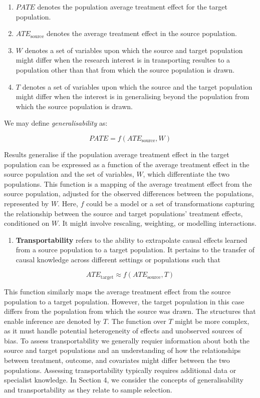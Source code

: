 \documentclass[
  singlecolumn]{report}
\providecommand{\tightlist}{%
  \setlength{\itemsep}{0pt}\setlength{\parskip}{0pt}}\usepackage{longtable,booktabs,array}
\begin{document}
\begin{enumerate}
\def\labelenumi{\alph{enumi}.}
\tightlist
\item
  \(PATE\) denotes the population average treatment effect for the
  target population.
\item
  \(ATE_{\text{source}}\) denotes the average treatment effect in the
  source population.
\item
  \(W\) denotes a set of variables upon which the source and target
  population might differ when the research interest is in transporting
  resultes to a population other than that from which the source
  population is drawn.
\item
  \(T\) denotes a set of variables upon which the source and the target
  population might differ when the interest is in generalising beyond
  the population from which the source population is drawn.
\end{enumerate}

We may define \emph{generalisability} as:

\[PATE =  f(ATE_{\text{source}}, W)\]

Results generalise if the population average treatment effect in the
target population can be expressed as a function of the average
treatment effect in the source population and the set of variables,
\(W\), which differentiate the two populations. This function is a
mapping of the average treatment effect from the source population,
adjusted for the observed differences between the populations,
represented by \(W\). Here, \(f\) could be a model or a set of
transformations capturing the relationship between the source and target
populations' treatment effects, conditioned on \(W\). It might involve
rescaling, weighting, or modelling interactions.

\begin{enumerate}
\def\labelenumi{\arabic{enumi}.}
\setcounter{enumi}{3}
\tightlist
\item
  \textbf{Transportability} refers to the ability to extrapolate causal
  effects learned from a source population to a target population. It
  pertains to the transfer of causal knowledge across different settings
  or populations such that
\end{enumerate}

\[ATE_{\text{target}} \approx f(ATE_{\text{source}}, T)\]

This function similarly maps the average treatment effect from the
source population to a target population. However, the target population
in this case differs from the population from which the source was
drawn. The structures that enable inference are denoted by \(T\). The
function over \(T\) might be more complex, as it must handle potential
heterogeneity of effects and unobserved sources of bias. To assess
transportability we generally requier information about both the source
and target populations and an understanding of how the relationships
between treatment, outcome, and covariates might differ between the two
populations. Assessing transportability typically requires additional
data or specialist knowledge. In Section 4, we consider the concepts of
generalisability and transportability as they relate to sample
selection.
\end{document}
